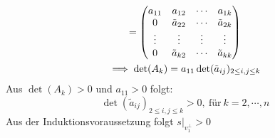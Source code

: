 \begin{Bew}
\begin{gather*}
    = \begin{pmatrix}a_{11}&a_{12}&\cdots&a_{1k}\\0&\tilde a_{22}&\cdots&\tilde a_{2k}\\\vdots&\vdots&\vdots&\vdots\\0&\tilde a_{k2}&\cdots&\tilde a_{kk}\end{pmatrix}\\
    \implies \det(A_k)=a_{11}\det(\tilde a_{ij})_{2\leq i,j\leq k}
  \end{gather*}
  Aus $\det(A_k)>0$ und $a_{11}>0$ folgt:
  \[\det(\tilde a_{ij})_{2\leq i,j\leq k}>0,\ \text{für}\ k=2,\cdots,n\]
  Aus der Induktionsvoraussetzung folgt $s|_{v_1^\perp}>0$
\end{Bew}
